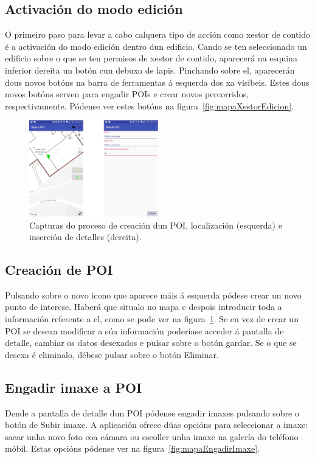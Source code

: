 \subsection{Activación do modo edición}
O primeiro paso para levar a cabo calquera tipo de acción como xestor de contido é a activación do modo edición dentro dun edificio. Cando se ten seleccionado un edificio sobre o que se ten permisos de xestor de contido, aparecerá na esquina inferior dereita un botón cun debuxo de lapis. Pinchando sobre el, aparecerán dous novos botóns na barra de ferramentas á esquerda dos xa visíbeis. Estes dous novos botóns serven para engadir POIs e crear novos percorridos, respectivamente. Pódense ver estes botóns na figura~\ref{fig:mapaXestorEdicion}.

\begin{figure}[h]
	\begin{center}
		\includegraphics[width=0.5\textwidth]{figures/android/mapaCrearPoi}
		\caption{Capturas do proceso de creación dun POI, localización (esquerda) e inserción de detalles (dereita).}
		\label{fig:mapaCrearPoi}
	\end{center}
\end{figure}

\subsection{Creación de POI}
Pulsando sobre o novo icono que aparece máis á esquerda pódese crear un novo punto de interese. Haberá que situalo no mapa e despois introducir toda a información referente a el, como se pode ver na figura~\ref{fig:mapaCrearPoi}. Se en vez de crear un POI se desexa modificar a súa información poderíase acceder á pantalla de detalle, cambiar os datos desexados e pulsar sobre o botón gardar. Se o que se desexa é eliminalo, débese pulsar sobre o botón Eliminar.

\subsection{Engadir imaxe a POI}
Dende a pantalla de detalle dun POI pódense engadir imaxes pulsando sobre o botón de Subir imaxe. A aplicación ofrece dúas opcións para seleccionar a imaxe: sacar unha novo foto coa cámara ou escoller unha imaxe na galería do teléfono móbil. Estas opcións pódense ver na figura~\ref{fig:mapaEngadirImaxe}.

